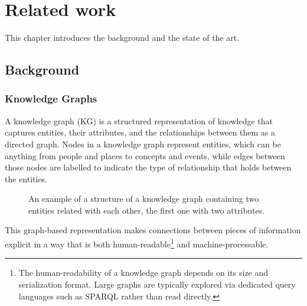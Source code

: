 
\chapter{Related work}
\label{chap:related-work}

This chapter introduces the background and the state of the art.


\section{Background}

\subsection{Knowledge Graphs}

A knowledge graph (KG) is a structured representation of knowledge that captures entities, their attributes, and the relationships between them as a directed graph. Nodes in a knowledge graph represent entities, which can be anything from people and places to concepts and events, while edges between those nodes are labelled to indicate the type of relationship that holds between the entities.

\begin{figure}[htbp]
\centering
\begin{minipage}{0.6\textwidth}
    \centering
    
\end{minipage}
\hfill
\begin{minipage}{0.35\textwidth}    
    \caption{An example of a structure of a knowledge graph containing two entities related with each other, the first one with two attributes.}
\end{minipage}
\label{fig:kg-example}
\end{figure}

This graph-based representation makes connections between pieces of information explicit in a way that is both human-readable\footnote{The human-readability of a knowledge graph depends on its size and serialization format. Large graphs are typically explored via dedicated query languages such as SPARQL rather than read directly.} and machine-processable. %


